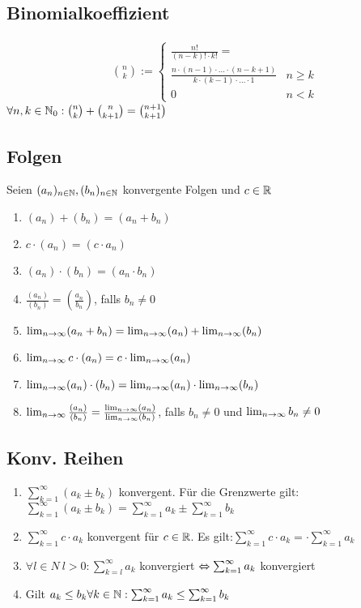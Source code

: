 \subsection*{Binomialkoeffizient}
\begin{align*}
    &\binom{n}{k} := \begin{cases}
    \frac{n!}{(n - k)! \cdot k!} = \\
    \frac{n \cdot (n-1)\cdot ... \cdot (n-k +1)}{k \cdot (k-1) \cdot ... \cdot 1} & n\geq k\\
    0 & n < k
    \end{cases}
\end{align*}
$\forall n, k \in \mathbb N_0: \binom{n}{k} + \binom{n}{k+1} = \binom{n +1}{k+1}$
\subsection*{Folgen}
Seien $(a_n)_{n \in \mathbb N}, (b_n)_{n \in \mathbb N}$ konvergente Folgen und $c\in \mathbb R$
\begin{enumerate}[label=\alph*., noitemsep]
    \item $(a_n) + (b_n) = (a_n + b_n)$
    \item $c \cdot (a_n) = (c \cdot a_n)$
    \item $(a_n) \cdot (b_n) = (a_n \cdot b_n)$
    \item $\frac{(a_n)}{(b_n)} = \left( \frac{a_n}{b_n} \right)$, falls $b_n \neq 0$
    \item $\lim_{n \rightarrow \infty} (a_n + b_n) = \lim_{n \rightarrow \infty} (a_n) + \lim_{n \rightarrow \infty} (b_n)$
    \item $\lim_{n \rightarrow \infty} c \cdot (a_n) = c \cdot \lim_{n \rightarrow \infty} (a_n)$
    \item $\lim_{n \rightarrow \infty} (a_n) \cdot (b_n) = \lim_{n \rightarrow \infty} (a_n) \cdot \lim_{n \rightarrow \infty} (b_n)$
    \item $\lim_{n \rightarrow \infty} \frac{(a_n)}{(b_n)} = \frac{\lim_{n \rightarrow \infty} (a_n)}{\lim_{n \rightarrow \infty} (b_n)}$, falls $b_n \neq 0$ und $\lim_{n \rightarrow \infty} b_n \neq 0$
\end{enumerate}
\subsection*{Konv. Reihen}
\begin{enumerate}[label=\alph*., noitemsep]
    \item $\sum_{k = 1}^\infty (a_k \pm b_k)$ konvergent. Für die Grenzwerte gilt:$\sum_{k = 1}^\infty (a_k \pm b_k) = \sum_{k = 1}^\infty a_k \pm \sum_{k = 1}^\infty b_k$
    \item $\sum_{k = 1}^\infty c \cdot a_k$ konvergent für $c \in \mathbb R$. Es gilt:$\sum_{k = 1}^\infty c \cdot a_k = \cdot \sum_{k = 1}^\infty a_k$
    \item $\forall l \in N \ l > 0: \sum_{k = l}^\infty a_k$ konvergiert $\Leftrightarrow \sum_{k = 1}^\infty a_k$ konvergiert
    \item Gilt $a_k \leq b_k \forall k \in \mathbb N: \sum_{k = 1}^\infty a_k \leq \sum_{k = 1}^\infty b_k$
\end{enumerate}
